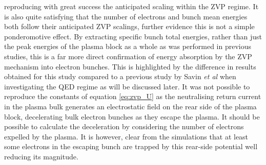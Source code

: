 reproducing with great success the anticipated scaling within the ZVP regime. It is also quite satisfying that the number of electrons and bunch mean energies both follow their anticipated ZVP scalings, further evidence this is not a simple ponderomotive effect. By extracting specific bunch total energies, rather than just the peak energies of the plasma block as a whole as was performed in previous studies, this is a far more direct confirmation of energy absorption by the ZVP mechanism into electron bunches. This is highlighted by the difference in results obtained for this study compared to a previous study by Savin \textit{et al} \cite{savin_2019_EnergyAbsorptionLaserQED} when investigating the QED regime as will be discussed later. It was not possible to reproduce the constants of equation \ref{eq:zvp_U} as the neutralising return current in the plasma bulk generates an electrostatic field on the rear side of the plasma block, decelerating bulk electron bunches as they escape the plasma. It should be possible to calculate the deceleration by considering the number of electrons expelled by the plasma. It is however, clear from the simulations that at least some electrons in the escaping bunch are trapped by this rear-side potential well reducing its magnitude.

